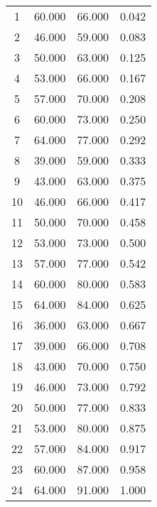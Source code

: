 % 
\begin{tabular}{cccc}
  \hline
  \hline
1 & 60.000 & 66.000 & 0.042 \\ 
  2 & 46.000 & 59.000 & 0.083 \\ 
  3 & 50.000 & 63.000 & 0.125 \\ 
  4 & 53.000 & 66.000 & 0.167 \\ 
  5 & 57.000 & 70.000 & 0.208 \\ 
  6 & 60.000 & 73.000 & 0.250 \\ 
  7 & 64.000 & 77.000 & 0.292 \\ 
  8 & 39.000 & 59.000 & 0.333 \\ 
  9 & 43.000 & 63.000 & 0.375 \\ 
  10 & 46.000 & 66.000 & 0.417 \\ 
  11 & 50.000 & 70.000 & 0.458 \\ 
  12 & 53.000 & 73.000 & 0.500 \\ 
  13 & 57.000 & 77.000 & 0.542 \\ 
  14 & 60.000 & 80.000 & 0.583 \\ 
  15 & 64.000 & 84.000 & 0.625 \\ 
  16 & 36.000 & 63.000 & 0.667 \\ 
  17 & 39.000 & 66.000 & 0.708 \\ 
  18 & 43.000 & 70.000 & 0.750 \\ 
  19 & 46.000 & 73.000 & 0.792 \\ 
  20 & 50.000 & 77.000 & 0.833 \\ 
  21 & 53.000 & 80.000 & 0.875 \\ 
  22 & 57.000 & 84.000 & 0.917 \\ 
  23 & 60.000 & 87.000 & 0.958 \\ 
  24 & 64.000 & 91.000 & 1.000 \\ 
   \hline
\end{tabular}
